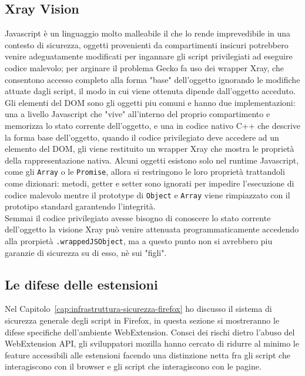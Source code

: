 \documentclass{sapthesis}
\newcommand{\code}[1]{\texttt{#1}}
\newcommand{\Capitolo}[1]{Capitolo~\ref{#1}}
\begin{document}
        \subsection{Xray Vision}
        \label{sec:sicurezza-xray-vision}
            Javascript è un linguaggio molto malleabile il che lo rende imprevedibile in una contesto di
            sicurezza, oggetti provenienti da compartimenti insicuri potrebbero venire adeguatamente
            modificati per ingannare gli script privilegiati ad eseguire codice malevolo; per arginare
            il problema Gecko fa uso dei wrapper Xray, che consentono accesso completo alla forma "base"
            dell'oggetto ignorando le modifiche attuate dagli script, il modo in cui viene ottenuta
            dipende dall'oggetto acceduto.\\
            Gli elementi del DOM sono gli oggetti piu comuni e hanno due implementazioni: 
            una a livello Javascript che "vive" all'interno del proprio compartimento e memorizza lo
            stato corrente dell'oggetto, e una in codice nativo C++ che descrive la forma base
            dell'oggetto, quando il codice privilegiato deve accedere ad un elemento del DOM, gli viene
            restituito un wrapper Xray che mostra le proprietà della rappresentazione nativa. 
            Alcuni oggetti esistono solo nel runtime Javascript, come gli \code{Array} o le \code{Promise},
            allora si restringono le loro proprietà trattandoli come dizionari: metodi, getter e setter 
            sono ignorati per impedire l'esecuzione di codice malevolo mentre il prototype di \code{Object}
            e \code{Array} viene rimpiazzato con il prototipo standard garantendo l'integrità.\\
            Semmai il codice privilegiato avesse bisogno di conoscere lo stato corrente dell'oggetto la
            visione Xray può venire attenuata programmaticamente accedendo alla prorpietà \code{.wrappedJSObject},
            ma a questo punto non si avrebbero piu garanzie di sicurezza su di esso, nè sui "figli".

        \subsection{Le difese delle estensioni}
        Nel \Capitolo{cap:infrastruttura-sicurezza-firefox} ho discusso il sistema di sicurezza generale
        degli script in Firefox, in questa sezione si mostreranno le difese specifiche dell'ambiente
        WebExtension. Consci dei rischi dietro l'abuso del WebExtension API, gli sviluppatori mozilla
        hanno cercato di ridurre al minimo le feature accessibili alle estensioni facendo una
        distinzione netta fra gli script che interagiscono con il browser e gli script che interagiscono
        con le pagine.
    
\end{document}
